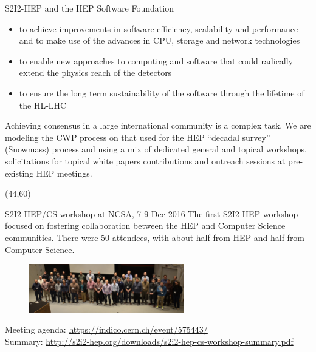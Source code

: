 \documentclass[final]{beamer}
\begin{document}
\begin{frame}{}
\begin{textblock}{38.0}
\begin{block}{S2I2-HEP and the HEP Software Foundation}
\begin{itemize}
\item to achieve improvements in software efficiency, scalability and performance and to make use of the advances in CPU, storage and network technologies
\item to enable new approaches to computing and software that could radically extend the physics reach of the detectors
\item to ensure the long term sustainability of the software through the lifetime of the HL-LHC
\end{itemize}

Achieving consensus in a large international community is a complex task. We are modeling the CWP process on that used for the HEP ``decadal survey'' (Snowmass) process and using a mix of dedicated general and topical workshops, solicitations for topical white papers contributions and outreach sessions at pre-existing HEP meetings.
\end{block}
\end{textblock}




\begin{textblock}{38.0}(44,60)
\begin{block}{S2I2 HEP/CS workshop at NCSA, 7-9 Dec 2016}
The first S2I2-HEP workshop focused on fostering collaboration between the HEP and Computer Science communities. There were 50 attendees, with about half from HEP and half from Computer Science.
\begin{figure}[tbph]
\centering
\includegraphics[width=0.60\textwidth]{images/20161208-s2i2-hep-cs-group-photo.jpg}
\end{figure}
\small{Meeting agenda: \url{https://indico.cern.ch/event/575443/}} \\
\small{Summary: \url{http://s2i2-hep.org/downloads/s2i2-hep-cs-workshop-summary.pdf}}
\end{block}
\end{textblock}


\end{frame}
\end{document}
